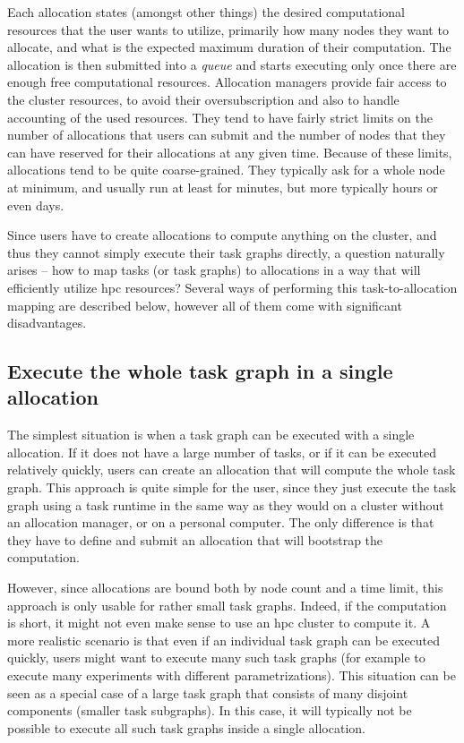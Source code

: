 Each allocation states (amongst other things) the desired computational resources that the user
wants to utilize, primarily how many nodes they want to allocate, and what is the expected maximum
duration of their computation. The allocation is then submitted into a \emph{queue}
and starts executing only once there are enough free computational resources. Allocation managers
provide fair access to the cluster resources, to avoid their oversubscription and also to handle
accounting of the used resources. They tend to have fairly strict limits on the number of
allocations that users can submit and the number of nodes that they can have reserved for their
allocations at any given time. Because of these limits, allocations tend to be quite
coarse-grained. They typically ask for a whole node at minimum, and usually run at least for
minutes, but more typically hours or even days.

Since users have to create allocations to compute anything on the cluster, and thus they cannot
simply execute their task graphs directly, a question naturally arises -- how to map tasks (or task
graphs) to allocations in a way that will efficiently utilize \gls{hpc} resources?
Several ways of performing this task-to-allocation mapping are described below, however all of them
come with significant disadvantages.

\subsection*{Execute the whole task graph in a single allocation}
The simplest situation is when a task graph can be executed with a single allocation. If it does
not have a large number of tasks, or if it can be executed relatively quickly, users can create an
allocation that will compute the whole task graph. This approach is quite simple for the user,
since they just execute the task graph using a task runtime in the same way as they would on a
cluster without an allocation manager, or on a personal computer. The only difference is that they
have to define and submit an allocation that will bootstrap the computation.

However, since allocations are bound both by node count and a time limit, this approach is only
usable for rather small task graphs. Indeed, if the computation is short, it might not even make
sense to use an \gls{hpc} cluster to compute it. A more realistic scenario is that
even if an individual task graph can be executed quickly, users might want to execute many such
task graphs (for example to execute many experiments with different parametrizations). This
situation can be seen as a special case of a large task graph that consists of many disjoint
components (smaller task subgraphs). In this case, it will typically not be possible to execute all
such task graphs inside a single allocation.

